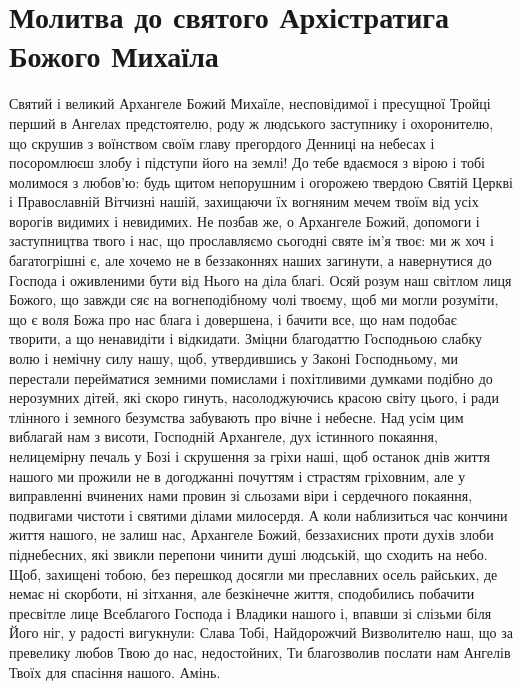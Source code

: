 \documentclass[chapters.tex]{subfiles}
\begin{document}
\section{Молитва до святого Архістратига Божого Михаїла}
Святий і великий Архангеле Божий Михаїле, несповідимої і пресущної Тройці перший в Ангелах предстоятелю, роду ж людського заступнику і охоронителю, що скрушив з воїнством своїм главу прегордого Денниці на небесах і посоромлюєш злобу і підступи його на землі! До тебе вдаємося з вірою і тобі молимося з любов’ю: будь щитом непорушним і огорожею твердою Святій Церкві і Православній Вітчизні нашій, захищаючи їх вогняним мечем твоїм від усіх ворогів видимих і невидимих. Не позбав же, о Архангеле Божий, допомоги і заступництва твого і нас, що прославляємо сьогодні святе ім’я твоє: ми ж хоч і багатогрішні є, але хочемо не в беззаконнях наших загинути, а навернутися до Господа і оживленими бути від Нього на діла благі. Осяй розум наш світлом лиця Божого, що завжди сяє на вогнеподібному чолі твоєму, щоб ми могли розуміти, що є воля Божа про нас блага і довершена, і бачити все, що нам подобає творити, а що ненавидіти і відкидати. Зміцни благодаттю Господньою слабку волю і немічну силу нашу, щоб, утвердившись у Законі Господньому, ми перестали перейматися земними помислами і похітливими думками подібно до нерозумних дітей, які скоро гинуть, насолоджуючись красою світу цього, і ради тлінного і земного безумства забувають про вічне і небесне. Над усім цим виблагай нам з висоти, Господній Архангеле, дух істинного покаяння, нелицемірну печаль у Бозі і скрушення за гріхи наші, щоб останок днів життя нашого ми прожили не в догоджанні почуттям і страстям гріховним, але у виправленні вчинених нами провин зі сльозами віри і сердечного покаяння, подвигами чистоти і святими ділами милосердя. А коли наблизиться час кончини життя нашого, не залиш нас, Архангеле Божий, беззахисних проти духів злоби піднебесних, які звикли перепони чинити душі людській, що сходить на небо. Щоб, захищені тобою, без перешкод досягли ми преславних осель райських, де немає ні скорботи, ні зітхання, але безкінечне життя, сподобились побачити пресвітле лице Всеблагого Господа і Владики нашого і, впавши зі слізьми біля Його ніг, у радості вигукнули: Слава Тобі, Найдорожчий Визволителю наш, що за превелику любов Твою до нас, недостойних, Ти благозволив послати нам Ангелів Твоїх для спасіння нашого. Амінь.
\end{document}
